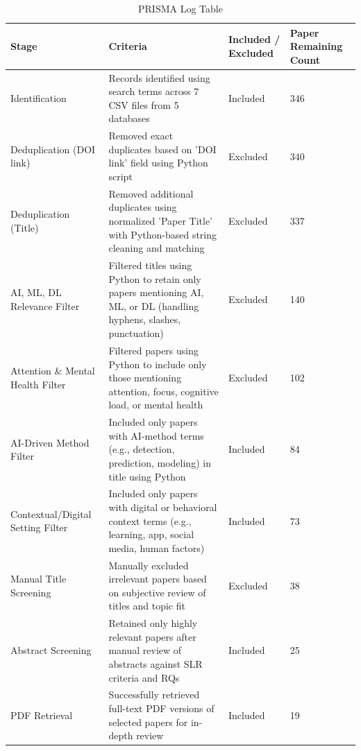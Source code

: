 \documentclass[12pt]{article}
\begin{document}
\begin{table}[H]
\centering
\caption{PRISMA Log Table}
\begin{tabular}{|p{}|p{}|p{}|p{}|}
\hline
\textbf{Stage} & \textbf{Criteria} & \textbf{Included / Excluded} & \textbf{Paper Remaining Count} \\
\hline
Identification & Records identified using search terms across 7 CSV files from 5 databases & Included & 346 \\
\hline
Deduplication (DOI link) & Removed exact duplicates based on 'DOI link' field using Python script & Excluded & 340 \\
\hline
Deduplication (Title) & Removed additional duplicates using normalized 'Paper Title' with Python-based string cleaning and matching & Excluded & 337 \\
\hline
AI, ML, DL Relevance Filter & Filtered titles using Python to retain only papers mentioning AI, ML, or DL (handling hyphens, slashes, punctuation) & Excluded & 140 \\
\hline
Attention \& Mental Health Filter & Filtered papers using Python to include only those mentioning attention, focus, cognitive load, or mental health & Excluded & 102 \\
\hline
AI-Driven Method Filter & Included only papers with AI-method terms (e.g., detection, prediction, modeling) in title using Python & Included & 84 \\
\hline
Contextual/Digital Setting Filter & Included only papers with digital or behavioral context terms (e.g., learning, app, social media, human factors) & Included & 73 \\
\hline
Manual Title Screening & Manually excluded irrelevant papers based on subjective review of titles and topic fit & Excluded & 38 \\
\hline
Abstract Screening & Retained only highly relevant papers after manual review of abstracts against SLR criteria and RQs & Included & 25 \\
\hline
PDF Retrieval & Successfully retrieved full-text PDF versions of selected papers for in-depth review & Included & 19 \\
\hline
\end{tabular}
\end{table}
\end{document}
